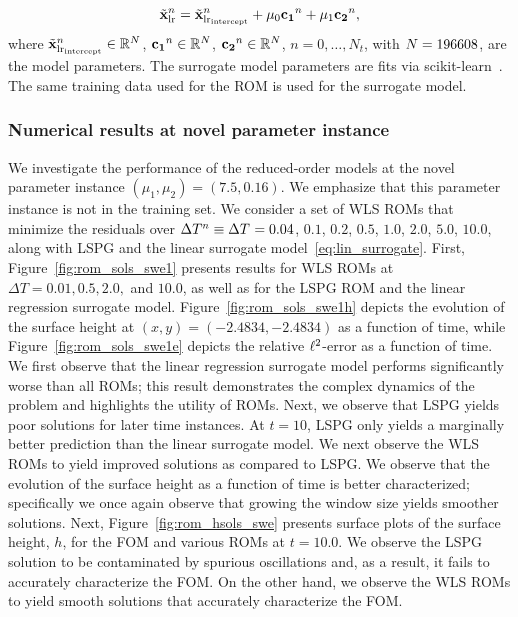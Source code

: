 \begin{equation}\label{eq:lin_surrogate}
\tilde{\mathbf{x}}_{\text{lr}}^n = {\tilde{\mathbf{x}}_{\text{lr}_{\text{intercept}}}}^n + \mu_0 \mathbf{c_1}^n + \mu_1 \mathbf{c_2}^n ,
\end{equation}
where $\tilde{\mathbf{x}}_{\text{lr}_{\text{intercept}}}^n \in \mathbb{R}^{N}$, $\mathbf{c_1}^n \in \mathbb{R}^{N}$, $\mathbf{c_2}^n \in \mathbb{R}^{N}$, $n=0,\ldots,N_t$, with $N = 196608$, are the model parameters. 
The surrogate model parameters are fits via \textsf{scikit-learn}~\cite{scikit-learn}. The same training data used for the ROM is used for the surrogate model.

\subsubsection{Numerical results at novel parameter instance}\label{sec:swe_results}
We investigate the performance of the reduced-order models at the novel parameter instance $(\mu_1, \mu_2) = (7.5,0.16)$. We emphasize that this parameter instance is not in the training set. We consider a set of WLS ROMs that minimize the residuals over $\Delta T^{n} \equiv \Delta T^{} = 0.04$, $0.1$, $0.2$, $0.5$, $1.0$, $2.0$, $5.0$, $10.0$, along with LSPG and the linear surrogate model~\eqref{eq:lin_surrogate}. First, Figure~\ref{fig:rom_sols_swe1} presents results for WLS ROMs at $\Delta T = 0.01,0.5,2.0,$ and $10.0$, as well as for the LSPG ROM and the linear regression surrogate model. Figure~\ref{fig:rom_sols_swe1h} depicts the evolution of the surface height at $(x,y) = (-2.4834,-2.4834)$ as a function of time, while Figure~\ref{fig:rom_sols_swe1e} depicts the relative $\ell^2$-error as a function of time. We first observe that the linear regression surrogate model performs significantly worse than all ROMs; this result demonstrates the complex dynamics of the problem and highlights the utility of ROMs. Next, we observe that LSPG yields poor solutions for later time instances. At $t=10$, LSPG only yields a marginally better prediction than the linear surrogate model. We next observe the WLS ROMs to yield improved solutions as compared to LSPG. We observe that the evolution of the surface height as a function of time is better characterized; specifically we once again observe that growing the window size yields smoother solutions. Next, Figure~\ref{fig:rom_hsols_swe} presents surface plots of the surface height, $h$, for the FOM and various ROMs at $t = 10.0$. We observe the LSPG solution to be contaminated by spurious oscillations and, as a result, it fails to accurately characterize the FOM. On the other hand, we observe the WLS ROMs to yield smooth solutions that accurately characterize the FOM.
 


